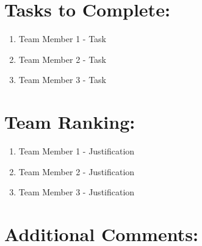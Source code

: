 \documentclass{article}
\begin{document}
\section{Tasks to Complete:}
\begin{enumerate}
  \item Team Member 1 - Task
  \item Team Member 2 - Task
  \item Team Member 3 - Task
\end{enumerate}


\section{Team Ranking:}
\begin{enumerate}
  \item Team Member 1 - Justification
  \item Team Member 2 - Justification
  \item Team Member 3 - Justification
\end{enumerate}


\section{Additional Comments:}






\end{document}
